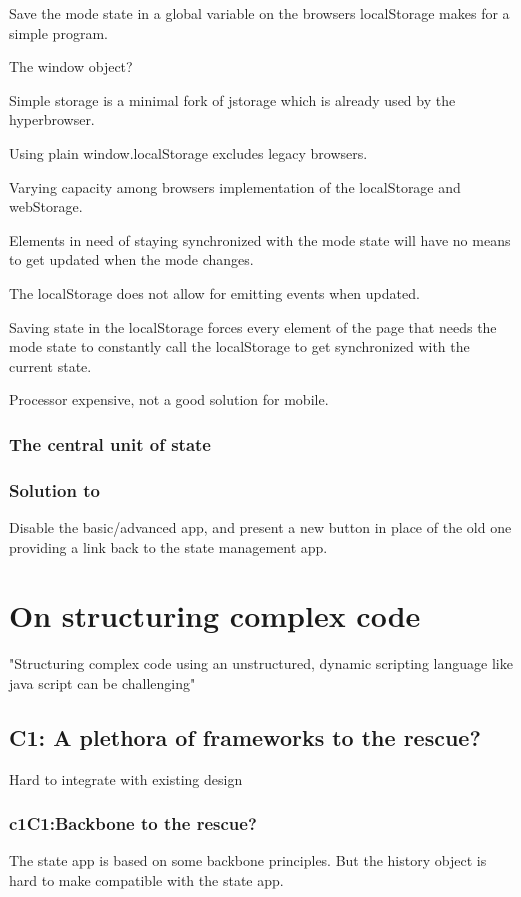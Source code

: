 \documentclass[english]{ifimaster}
\begin{document}
Save the mode state in a global variable on the browsers localStorage makes for a simple program.

The window object?

Simple storage is a minimal fork of jstorage which is already used by the hyperbrowser.

Using plain window.localStorage excludes legacy browsers.

Varying capacity among browsers implementation of the localStorage and webStorage.

Elements in need of staying synchronized with the mode state will have no means to get updated when the mode changes.

The localStorage does not allow for emitting events when updated.

Saving state in the localStorage forces every element of the page that needs the mode state to constantly call the localStorage to get synchronized with the current state.

Processor expensive, not a good solution for mobile.
\subsection{The central unit of state}
\label{sec:modelVSuri} 
\subsection{Solution to } 
Disable the basic/advanced app, and present a new button in place of the old one providing a link back to the state management app.

\chapter{On structuring complex code}
\label{sec:patterns}
"Structuring complex code using an unstructured, dynamic scripting language like java script can be challenging"
\section{C1: A plethora of frameworks to the rescue?}
Hard to integrate with existing design
\subsection{c1C1:Backbone to the rescue?}
The state app is based on some backbone principles. But the history object is hard to make compatible with the state app. 
\end{document}
